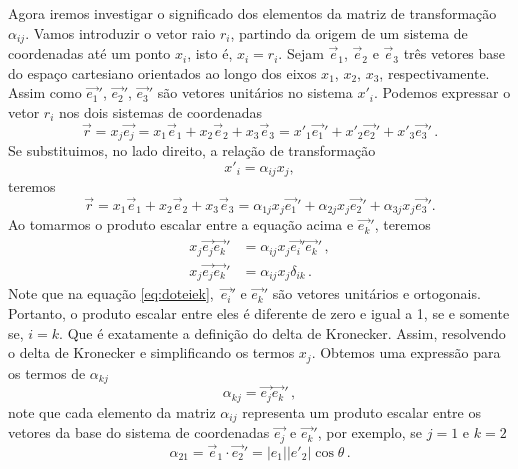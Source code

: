 Agora iremos investigar o significado dos elementos da matriz de transforma\c{c}\~ao
$\alpha_{ij}$. Vamos introduzir o vetor raio $r_{i}$, partindo da
origem de um sistema de coordenadas at\'e um ponto $x_{i}$, isto
\'e, $x_{i}=r_{i}$. Sejam $\vec{e}_{1}$, $\vec{e}_{2}$ e
$\vec{e}_{3}$ tr\^es vetores base do espa\c{c}o cartesiano 
orientados ao longo dos eixos $x_{1}$, $x_{2}$,
$x_{3}$, respectivamente. Assim como $\vec{e_{1}}'$,
$\vec{e_{2}}'$, $\vec{e_{3}}'$ s\~ao vetores unit\'arios no
sistema $x'_{i}$.
Podemos expressar o vetor $r_{i}$ nos dois sistemas de
coordenadas
\begin{equation}
  \vec{r}=x_{j}\vec{e_{j}}=x_{1}\vec{e}_{1}+x_{2}\vec{e}_{2}+x_{3}\vec{e}_{3}=x'_{1}\vec{e_{1}}'+
x'_{2}\vec{e_{2}}'+x'_{3}\vec{e_{3}}'\, .
\end{equation}
Se substituimos, no lado direito, a rela\c{c}\~ao de transforma\c{c}\~ao
\begin{equation}
x'_{i}=\alpha_{ij}x_{j},
\end{equation}
teremos
\begin{equation}
\vec{r}=x_{1}\vec{e}_{1}+x_{2}\vec{e}_{2}+
x_{3}\vec{e}_{3}=\alpha_{1j}x_{j}\vec{e_{1}}'+
\alpha_{2j}x_{j}\vec{e_{2}}'+\alpha_{3j}x_{j}\vec{e_{3}}'.
\end{equation}
Ao tomarmos o produto escalar entre a equa\c{c}\~ao acima e $\vec{e_{k}}'$, teremos
\begin{align}
   x_j\vec{e_{j}} \vec{e_{k}}' &= \alpha_{ij}x_j\vec{e_{i}}'\vec{e_{k}}' \, ,
  \label{eq:doteiek} \\
  x_j\vec{e_{j}}\vec{e_{k}}' &= \alpha_{ij}x_j\delta_{ik} \, .
\end{align}
Note que na equa\c{c}\~ao \ref{eq:doteiek}, $\,\vec{e_{i}}'$ e $\vec{e_{k}}'$ s\~ao vetores 
unit\'arios e ortogonais. Portanto, o
produto escalar entre eles \'e diferente de zero e igual a 1, se e somente se,
$i=k$. Que \'e exatamente a defini\c{c}\~ao do delta de Kronecker.
Assim, resolvendo o delta de Kronecker e simplificando os termos $x_j$.
Obtemos uma express\~ao para os termos de $\alpha_{kj}$
\begin{equation}
  \alpha_{kj}=\vec{e_{j}}\vec{e_{k}}'\, ,
\end{equation}
note que cada elemento da matriz $\alpha_{ij}$ representa um produto
escalar entre os vetores da base do sistema de coordenadas $\vec{e_{j}}$
e $\vec{e_{k}}'$, por exemplo, se $j=1$ e $k=2$
\begin{equation}
\alpha_{21}=\vec{e}_{1} \cdot \vec{e_{2}}' = 
  \lvert e_{1}\rvert\lvert e'_{2}\rvert \cos{\theta} \, .
\end{equation}

